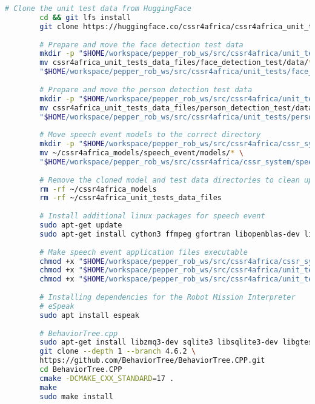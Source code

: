 \documentclass{CSSRforAfrica}
\begin{document}
{\begin{lstlisting}[style=withoutNumbering, language=bash]
		# Clone the unit test data from HuggingFace
		cd && git lfs install
		git clone https://huggingface.co/cssr4africa/cssr4africa_unit_tests_data_files
		
		# Prepare and move the face detection test data
		mkdir -p "$HOME/workspace/pepper_rob_ws/src/cssr4africa/unit_tests/face_detection_test/data"
		mv cssr4africa_unit_tests_data_files/face_detection_test/data/* \
		"$HOME/workspace/pepper_rob_ws/src/cssr4africa/unit_tests/face_detection_test/data/"
		
		# Prepare and move the person detection test data
		mkdir -p "$HOME/workspace/pepper_rob_ws/src/cssr4africa/unit_tests/person_detection_test/data"
		mv cssr4africa_unit_tests_data_files/person_detection_test/data/* \
		"$HOME/workspace/pepper_rob_ws/src/cssr4africa/unit_tests/person_detection_test/data/"
		
		# Move speech event models to the correct directory
		mkdir -p "$HOME/workspace/pepper_rob_ws/src/cssr4africa/cssr_system/speech_event/models"
		mv ~/cssr4africa_models/speech_event/models/* \
		"$HOME/workspace/pepper_rob_ws/src/cssr4africa/cssr_system/speech_event/models"
		
		# Remove the cloned model and test data directories to clean up
		rm -rf ~/cssr4africa_models
		rm -rf ~/cssr4africa_unit_tests_data_files
		
		# Install additional linux packages for speech event
		sudo apt-get update
		sudo apt-get install cython3 ffmpeg gfortran libopenblas-dev libopenblas64-dev patchelf pkg-config portaudio19-dev python3-testresources python3-tk python3-typing-extensions sox
		
		# Make speech event application files executable
		chmod +x "$HOME/workspace/pepper_rob_ws/src/cssr4africa/cssr_system/speech_event/src/speech_event_application.py"
		chmod +x "$HOME/workspace/pepper_rob_ws/src/cssr4africa/unit_tests/speech_event_test/src/speech_event_test_application.py"
		chmod +x "$HOME/workspace/pepper_rob_ws/src/cssr4africa/unit_tests/speech_event_test/src/speech_event_driver.py"
		
		# Installing dependencies for the Robot Mission Interpreter
		# eSpeak
		sudo apt install espeak
		
		# BehaviorTree.cpp
		sudo apt-get install libzmq3-dev sqlite3 libsqlite3-dev libgtest-dev
		git clone --depth 1 --branch 4.6.2 \
		https://github.com/BehaviorTree/BehaviorTree.CPP.git
		cd BehaviorTree.CPP
		cmake -DCMAKE_CXX_STANDARD=17 .
		make
		sudo make install
		
		\end{lstlisting}
		
}
\end{document}
